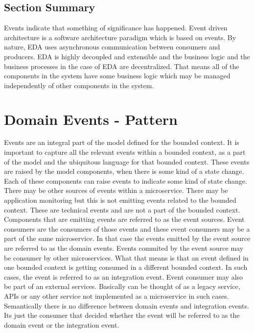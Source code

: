 \subsection{Section Summary}
Events indicate that something of significance has happened.
Event driven architecture is a software architecture paradigm which is based on events.
By nature, EDA uses asynchronous communication between consumers and producers.
EDA is highly decoupled and extensible and the business logic and the business processes in the case of EDA are decentralized.
That means all of the components in the system have some business logic which may be managed independently of other components in the system.


\section{Domain Events - Pattern}
Events are an integral part of the model defined for the bounded context.
It is important to capture all the relevant events within a bounded context, as a part of the model and the ubiquitous language for that bounded context.
These events are raised by the model components, when there is some kind of a state change.
Each of these components can raise events to indicate some kind of state change.
There may be other sources of events within a microservice.
There may be application monitoring but this is not emitting events related to the bounded context.
These are technical events and are not a part of the bounded context.
Components that are emitting events are referred to as the event sources.
Event consumers are the consumers of those events and these event consumers may be a part of the same microservice.
In that case the events emitted by the event source are referred to as the domain events.
Events commited by the event source may be consumer by other microservices.
What that means is that an event defined in one bounded context is getting consumed in a different bounded context.
In such cases, the event is referred to as an integration event.
Event consumer may also be part of an external services. Basically can be thought of as a legacy service, APIs or any other service not implemented as a microservice in such cases.
Semantically there is no difference between domain events and integration events.
Its just the consumer that decided whether the event will be referred to as the domain event or the integration event.

